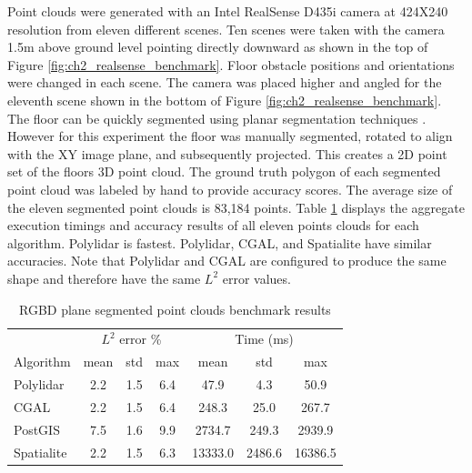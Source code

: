 Point clouds were generated with an Intel RealSense D435i camera at 424X240 resolution from eleven different scenes. Ten scenes were taken with the camera 1.5m above ground level pointing directly downward as shown in the top of Figure \ref{fig:ch2_realsense_benchmark}. Floor obstacle positions and orientations were changed in each scene.  The camera was placed higher and angled for the eleventh scene shown in the bottom of Figure \ref{fig:ch2_realsense_benchmark}. The floor can be quickly segmented using planar segmentation techniques \cite{feng_fast_2014, pham_geometrically_2016-1}. However for this experiment the floor was manually segmented, rotated to align with the XY image plane, and subsequently projected. This creates a 2D point set of the floors 3D point cloud. The ground truth polygon of each segmented point cloud was labeled by hand to provide accuracy scores.  The average size of the eleven segmented point clouds is 83,184 points. Table \ref{table:ch2_rgbd_results} displays the aggregate execution timings and accuracy results of all eleven points clouds for each algorithm. Polylidar is fastest. Polylidar, CGAL, and Spatialite have similar accuracies. Note that Polylidar and CGAL are configured to produce the same shape and therefore have the same $L^2$ error values.


\begin{table}[!ht]
\centering
\caption{RGBD plane segmented point clouds benchmark results}
\label{table:ch2_rgbd_results}
\begin{tabular}{lcccccc}
\toprule
{} & \multicolumn{3}{c}{$L^2$ error \%} & \multicolumn{3}{c}{Time (ms)} \\
{Algorithm} &    mean & std &  max &      mean &     std &     max \\
\midrule
Polylidar  &           2.2   &   1.5 &      6.4 & 47.9 & 4.3 & 50.9  \\
CGAL       &           2.2 &    1.5 &      6.4 & 248.3 & 25.0 & 267.7        \\
PostGIS    &           7.5 & 1.6 & 9.9   & 2734.7 & 249.3 & 2939.9     \\
Spatialite &           2.2 & 1.5 & 6.3 &  13333.0 & 2486.6  &   16386.5 \\
\bottomrule
\end{tabular}
\end{table}

